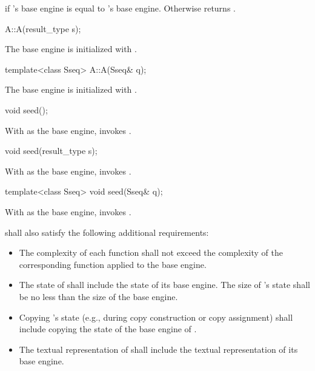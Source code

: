 \begin{itemdescr}
\pnum\returns
  if 's base engine is equal to 's base engine.
 Otherwise returns .
\end{itemdescr}


\begin{itemdecl}
A::A(result_type s);
\end{itemdecl}

\begin{itemdescr}
\pnum\effects
 The base engine is initialized
 with .
\end{itemdescr}


\begin{itemdecl}
template<class Sseq> A::A(Sseq& q);
\end{itemdecl}

\begin{itemdescr}
\pnum\effects
 The base engine is initialized
 with .
\end{itemdescr}

\begin{itemdecl}
void seed();
\end{itemdecl}

\begin{itemdescr}
\pnum\effects
 With  as the base engine, invokes .
\end{itemdescr}

\begin{itemdecl}
void seed(result_type s);
\end{itemdecl}

\begin{itemdescr}
\pnum\effects
 With  as the base engine, invokes .
\end{itemdescr}

\begin{itemdecl}
template<class Sseq> void seed(Sseq& q);
\end{itemdecl}

\begin{itemdescr}
\pnum\effects
 With  as the base engine, invokes .
\end{itemdescr}

\pnum
{} shall also satisfy
the following additional requirements:
\begin{itemize}
 \item
   The complexity
   of each function
   shall not exceed the complexity
   of the corresponding function
   applied to the base engine.
 \item
   The state
   of 
   shall include the state
   of its base engine.
   The size of 's state
   shall be no less than the size of the base engine.
 \item
   Copying 's state
   (e.g., during copy construction or copy assignment)
   shall include copying
   the state of the base engine of .
 \item
   The textual representation
   of 
   shall include
   the textual representation of its base engine.
\end{itemize}

